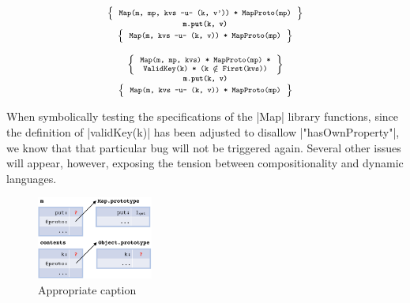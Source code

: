 \smallskip
\begin{minipage}{0.475\textwidth}
\begin{displaymath} 
{\scriptsize
\begin{array}{c}
\left\{ {\begin{array}{c}
 \text{\texttt{Map(m, mp, kvs -u- (k, v')) * MapProto(mp)}}
\end{array}} \right\} \\
%
\text{\bfseries \texttt{m.put(k, v)}} \\[0.2mm]
%
\left\{ {\begin{array}{c}
 \text{\texttt{Map(m, kvs -u- (k, v)) * MapProto(mp)}}
\end{array}} \right\}
\end{array}
} 
\end{displaymath}
\end{minipage}
\quad
\begin{minipage}{0.48\textwidth}
%
\begin{displaymath} 
{\scriptsize
\begin{array}{c}
\left\{ {\begin{array}{c}
 \text{\texttt{Map(m, mp, kvs) * MapProto(mp) *}} \\
 \text{\texttt{ValidKey(k) * (k $\notin$ First(kvs))}}
\end{array}} \right\} \\
%
\text{\bfseries \texttt{m.put(k, v)}} \\[0.2mm]
%
\left\{ {\begin{array}{c}
 \text{\texttt{Map(m, kvs -u- (k, v)) * MapProto(mp)}}
\end{array}} \right\}
\end{array}
} 
\end{displaymath}
\end{minipage}

\medskip
When symbolically testing the specifications of the \jsinline|Map| library functions, since the definition of \jsinline|validKey(k)| has been adjusted to disallow \jsinline|"hasOwnProperty"|, we know that that particular bug will not be triggered again. Several other issues will appear, however, exposing the tension between compositionality and dynamic languages. 

\begin{figure}
\vspace*{-0.4cm}
\centering
\includegraphics[width=0.34\textwidth]{figures/compositional.png}
\vspace*{-0.2cm}
\caption{Appropriate caption}
\label{fig:compositionality}
\vspace*{-0.4cm}
\end{figure}

